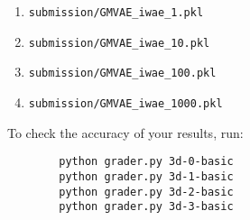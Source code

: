 \begin{enumerate}[label=(\alph*)]
   \begin{enumerate}
        \item \texttt{submission/GMVAE\_iwae\_1.pkl}
        \item \texttt{submission/GMVAE\_iwae\_10.pkl}
        \item \texttt{submission/GMVAE\_iwae\_100.pkl}
        \item \texttt{submission/GMVAE\_iwae\_1000.pkl}
    \end{enumerate}

    To check the accuracy of your results, run:
    \begin{verbatim}
        python grader.py 3d-0-basic
        python grader.py 3d-1-basic
        python grader.py 3d-2-basic
        python grader.py 3d-3-basic
    \end{verbatim}

\end{enumerate}